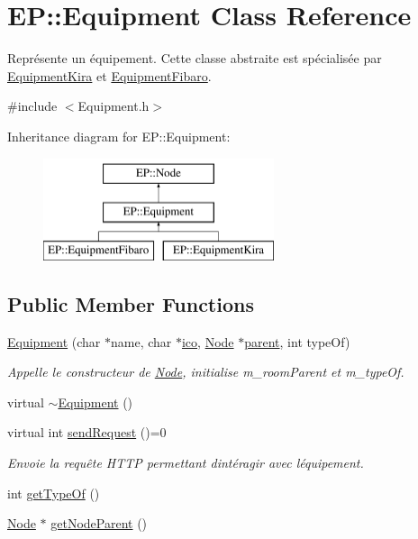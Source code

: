 \hypertarget{class_e_p_1_1_equipment}{}\section{EP\+:\+:Equipment Class Reference}
\label{class_e_p_1_1_equipment}


Représente un équipement. Cette classe abstraite est spécialisée par \hyperlink{class_e_p_1_1_equipment_kira}{Equipment\+Kira} et \hyperlink{class_e_p_1_1_equipment_fibaro}{Equipment\+Fibaro}.  




{\ttfamily \#include $<$Equipment.\+h$>$}

Inheritance diagram for EP\+:\+:Equipment\+:\begin{figure}[H]
\begin{center}
\leavevmode
\includegraphics[height=3.000000cm]{class_e_p_1_1_equipment}
\end{center}
\end{figure}
\subsection*{Public Member Functions}
\begin{DoxyCompactItemize}
\item 
\hyperlink{class_e_p_1_1_equipment_a7fce8df2fed82ae05a50f1489307e2ae}{Equipment} (char $\ast$name, char $\ast$\hyperlink{namespace_e_p_a9bb18717237cbb94269e26c77cc04b05}{ico}, \hyperlink{class_e_p_1_1_node}{Node} $\ast$\hyperlink{namespace_e_p_ae54856cdea91964313d781ec414f88fc}{parent}, int type\+Of)
\begin{DoxyCompactList}\small\item\em Appelle le constructeur de \hyperlink{class_e_p_1_1_node}{Node}, initialise m\+\_\+room\+Parent et m\+\_\+type\+Of. \end{DoxyCompactList}\item 
virtual \hyperlink{class_e_p_1_1_equipment_a599cde34c3ebe66ce00bd72a28253d66}{$\sim$\+Equipment} ()
\item 
virtual int \hyperlink{class_e_p_1_1_equipment_ab95a169fa00d4b7408bf30320f5b7ad8}{send\+Request} ()=0
\begin{DoxyCompactList}\small\item\em Envoie la requête H\+T\+TP permettant d\textquotesingle{}intéragir avec l\textquotesingle{}équipement. \end{DoxyCompactList}\item 
int \hyperlink{class_e_p_1_1_equipment_aac7c97005aec719e51483c9719386015}{get\+Type\+Of} ()
\item 
\hyperlink{class_e_p_1_1_node}{Node} $\ast$ \hyperlink{class_e_p_1_1_equipment_a4a65e982a7ca98587344786d57745b22}{get\+Node\+Parent} ()
\end{DoxyCompactItemize}
